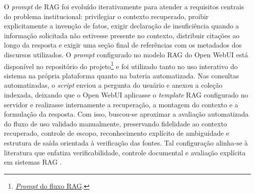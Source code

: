 O \textit{prompt} de RAG foi evoluído iterativamente para atender a requisitos centrais do problema institucional: privilegiar o contexto recuperado, proibir explicitamente a invenção de fatos, exigir declaração de insuficiência quando a informação solicitada não estivesse presente no contexto, distribuir citações ao longo da resposta e exigir uma seção final de referências com os metadados dos discursos utilizados. O \textit{prompt} configurado no modelo RAG do Open WebUI está disponível no repositório do projeto\footnote{\href{https://github.com/fabriciosantana/mcdia/blob/main/05-iag/4-project/eval/prompts/rag_prompt.md}{\textit{Prompt} do fluxo RAG}.} e foi utilizado tanto no uso interativo do sistema na própria plataforma quanto na bateria automatizada. Nas consultas automatizadas, o \textit{script} enviou a pergunta do usuário e anexou a coleção indexada, deixando que o Open WebUI aplicasse o \textit{template} RAG configurado no servidor e realizasse internamente a recuperação, a montagem do contexto e a formulação da resposta. Com isso, buscou-se aproximar a avaliação automatizada do fluxo de uso validado manualmente, preservando fidelidade ao contexto recuperado, controle de escopo, reconhecimento explícito de ambiguidade e estrutura de saída orientada à verificação das fontes. Tal configuração alinha-se à literatura que enfatiza verificabilidade, controle documental e avaliação explícita em sistemas RAG \parencite{gao2023ragSurvey,saadFalconEtAl2024ares,esEtAl2023ragas}.

